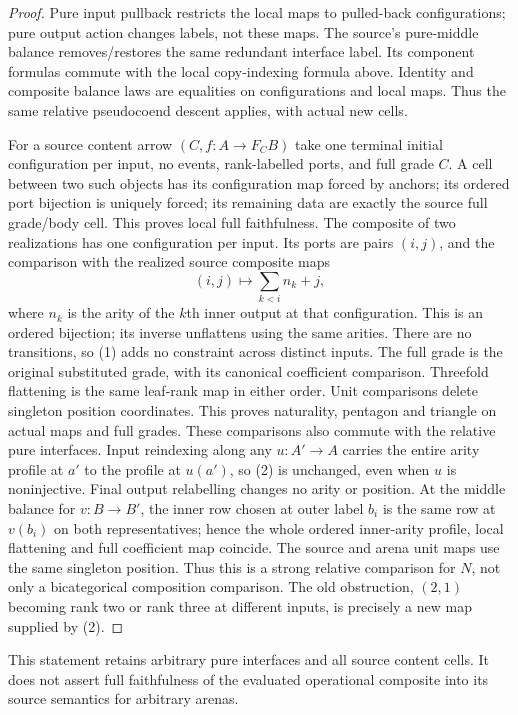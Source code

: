 \documentclass[11pt]{article}
\begin{document}
\begin{proof}
Pure input pullback restricts the local maps to pulled-back configurations;
pure output action changes labels, not these maps. The source's pure-middle
balance removes/restores the same redundant interface label. Its component
formulas commute with the local copy-indexing formula above. Identity and
composite balance laws are equalities on configurations and local maps.
Thus the same relative pseudocoend descent applies, with actual new cells.

For a source content arrow $(C,f:A\to F_C B)$ take one terminal initial
configuration per input, no events, rank-labelled ports, and full grade $C$.
A cell between two such objects has its configuration map forced by anchors;
its ordered port bijection is uniquely forced; its remaining data are exactly
the source full grade/body cell. This proves local full faithfulness.
The composite of two realizations has one configuration per input. Its ports
are pairs $(i,j)$, and the comparison with the realized source composite maps
\[
 (i,j)\longmapsto \sum_{k<i} n_k+j,                         \tag{2}
\]
where $n_k$ is the arity of the $k$th inner output at that configuration.
This is an ordered bijection; its inverse unflattens using the same arities.
There are no transitions, so (1) adds no constraint across distinct inputs.
The full grade is the original substituted grade, with its canonical
coefficient comparison. Threefold flattening is the same leaf-rank map in
either order. Unit comparisons delete singleton position coordinates.
This proves naturality, pentagon and triangle on actual maps and full grades.
These comparisons also commute with the relative pure interfaces. Input
reindexing along any $u:A'\to A$ carries the entire arity profile at $a'$
to the profile at $u(a')$, so (2) is unchanged, even when $u$ is noninjective.
Final output relabelling changes no arity or position. At the middle balance
for $v:B\to B'$, the inner row chosen at outer label $b_i$ is the same row
at $v(b_i)$ on both representatives; hence the whole ordered inner-arity
profile, local flattening and full coefficient map coincide. The source
and arena unit maps use the same singleton position. Thus this is a strong
relative comparison for $N$, not only a bicategorical composition comparison.
The old obstruction, $(2,1)$ becoming rank two or rank three at different
inputs, is precisely a new map supplied by (2).
\end{proof}
This statement retains arbitrary pure interfaces and all source content cells.
It does not assert full faithfulness of the evaluated operational composite
into its source semantics for arbitrary arenas.
\end{document}
